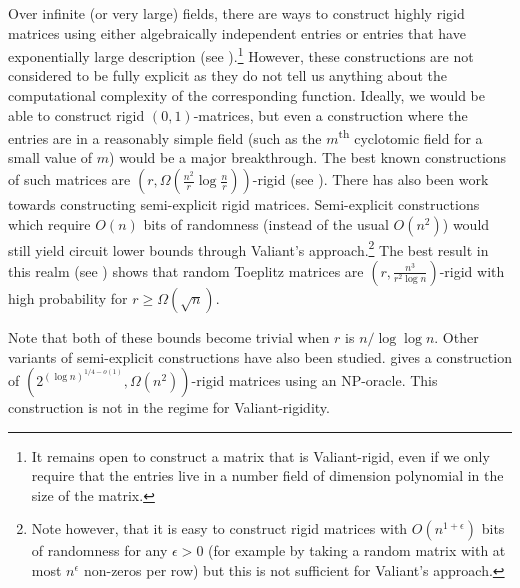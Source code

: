 \documentclass[11pt]{article}
\numberwithin{equation}{section}
\theoremstyle{definition}
\theoremstyle{plain}
\theoremstyle{definition}
\newcommand{\ts}{\textsuperscript}
\begin{document}
Over infinite (or very large) fields, there are ways to construct  highly rigid matrices using either algebraically independent  entries or entries that have exponentially large description (see \cite{construction1, construction2, Vandermonde}).\footnote{It remains open to construct a matrix
 that is Valiant-rigid, even if we only require that the entries live
 in a number field of dimension polynomial in the size of the matrix.}  
However, these constructions are not considered to be fully explicit as they do not tell us anything about the computational complexity of the corresponding function.  Ideally, we would be able to construct rigid $(0,1)$-matrices, 
but even a construction where the entries are in a reasonably simple field
%
%
(such as the $m$\ts{th} cyclotomic field for a small value of $m$)  %
would be a major breakthrough.  The best known constructions of such
matrices are 
%
$(r,\Omega(\frac{n^2}{r} \log \frac{n}{r}))$-rigid
%
(see \cite{rigidity_construction, friedman_rigidity}).  There has also been work towards constructing semi-explicit rigid matrices.  Semi-explicit constructions which require $O(n)$ bits of randomness (instead of the usual $O(n^2)$) would still yield circuit lower bounds through Valiant's approach.\footnote{Note however, that it is easy to construct rigid matrices with $O(n^{1 + \epsilon})$ bits of randomness for any $\epsilon > 0$ (for example by taking a random matrix with at most $n^{\epsilon}$ non-zeros per row) but this is not sufficient for Valiant's approach.}  The best result in this realm (see \cite{toeplitz}) shows that random Toeplitz matrices are $(r, \frac{n^3}{r^2 \log n})$-rigid with high probability for $r \geq \Omega(\sqrt n)$.

Note that both of these bounds become trivial when $r$ is
%
$n/\log\log n$.       %
Other variants of semi-explicit constructions have also been studied.
\cite{npconstruction} gives a construction of 
%
$(2^{(\log n)^{1/4 - o(1)}}, \Omega(n^2) )$-rigid 
%
matrices using an NP-oracle.  This construction is not in the regime
for Valiant-rigidity.
\end{document}

